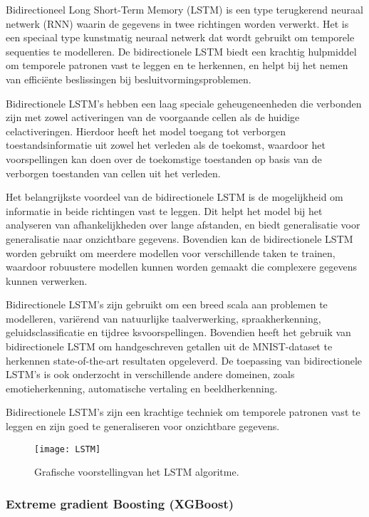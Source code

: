 Bidirectioneel Long Short-Term Memory (LSTM) is een type terugkerend neuraal netwerk (RNN) waarin de gegevens in twee richtingen worden verwerkt. Het is een speciaal type kunstmatig neuraal netwerk dat wordt gebruikt om temporele sequenties te modelleren. De bidirectionele LSTM biedt een krachtig hulpmiddel om temporele patronen vast te leggen en te herkennen, en helpt bij het nemen van efficiënte beslissingen bij besluitvormingsproblemen.

Bidirectionele LSTM's hebben een laag speciale geheugeneenheden die verbonden zijn met zowel activeringen van de voorgaande cellen als de huidige celactiveringen. Hierdoor heeft het model toegang tot verborgen toestandsinformatie uit zowel het verleden als de toekomst, waardoor het voorspellingen kan doen over de toekomstige toestanden op basis van de verborgen toestanden van cellen uit het verleden.

Het belangrijkste voordeel van de bidirectionele LSTM is de mogelijkheid om informatie in beide richtingen vast te leggen. Dit helpt het model bij het analyseren van afhankelijkheden over lange afstanden, en biedt generalisatie voor generalisatie naar onzichtbare gegevens. Bovendien kan de bidirectionele LSTM worden gebruikt om meerdere modellen voor verschillende taken te trainen, waardoor robuustere modellen kunnen worden gemaakt die complexere gegevens kunnen verwerken.

Bidirectionele LSTM's zijn gebruikt om een breed scala aan problemen te modelleren, variërend van natuurlijke taalverwerking, spraakherkenning, geluidsclassificatie en tijdree
ksvoorspellingen. Bovendien heeft het gebruik van bidirectionele LSTM om handgeschreven getallen uit de MNIST-dataset te herkennen state-of-the-art resultaten opgeleverd. De toepassing van bidirectionele LSTM's is ook onderzocht in verschillende andere domeinen, zoals emotieherkenning, automatische vertaling en beeldherkenning.

Bidirectionele LSTM's zijn een krachtige techniek om temporele patronen vast te leggen en zijn goed te generaliseren voor onzichtbare gegevens. 

\begin{figure}[h!]
    \centering\texttt{[image: LSTM]}
    \caption{\label{fig:LSTM}Grafische voorstellingvan het LSTM algoritme.}
\end{figure} 

\subsubsection{Extreme gradient Boosting (XGBoost)}

